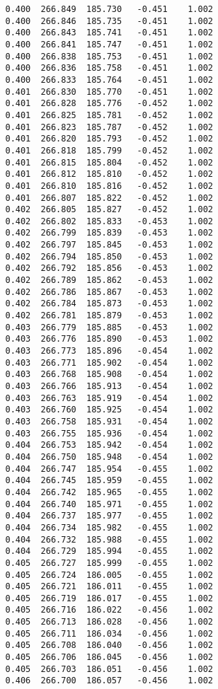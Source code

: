 \begin{verbatim}
   0.400  266.849  185.730   -0.451    1.002
   0.400  266.846  185.735   -0.451    1.002
   0.400  266.843  185.741   -0.451    1.002
   0.400  266.841  185.747   -0.451    1.002
   0.400  266.838  185.753   -0.451    1.002
   0.400  266.836  185.758   -0.451    1.002
   0.400  266.833  185.764   -0.451    1.002
   0.401  266.830  185.770   -0.451    1.002
   0.401  266.828  185.776   -0.452    1.002
   0.401  266.825  185.781   -0.452    1.002
   0.401  266.823  185.787   -0.452    1.002
   0.401  266.820  185.793   -0.452    1.002
   0.401  266.818  185.799   -0.452    1.002
   0.401  266.815  185.804   -0.452    1.002
   0.401  266.812  185.810   -0.452    1.002
   0.401  266.810  185.816   -0.452    1.002
   0.401  266.807  185.822   -0.452    1.002
   0.402  266.805  185.827   -0.452    1.002
   0.402  266.802  185.833   -0.453    1.002
   0.402  266.799  185.839   -0.453    1.002
   0.402  266.797  185.845   -0.453    1.002
   0.402  266.794  185.850   -0.453    1.002
   0.402  266.792  185.856   -0.453    1.002
   0.402  266.789  185.862   -0.453    1.002
   0.402  266.786  185.867   -0.453    1.002
   0.402  266.784  185.873   -0.453    1.002
   0.402  266.781  185.879   -0.453    1.002
   0.403  266.779  185.885   -0.453    1.002
   0.403  266.776  185.890   -0.453    1.002
   0.403  266.773  185.896   -0.454    1.002
   0.403  266.771  185.902   -0.454    1.002
   0.403  266.768  185.908   -0.454    1.002
   0.403  266.766  185.913   -0.454    1.002
   0.403  266.763  185.919   -0.454    1.002
   0.403  266.760  185.925   -0.454    1.002
   0.403  266.758  185.931   -0.454    1.002
   0.403  266.755  185.936   -0.454    1.002
   0.404  266.753  185.942   -0.454    1.002
   0.404  266.750  185.948   -0.454    1.002
   0.404  266.747  185.954   -0.455    1.002
   0.404  266.745  185.959   -0.455    1.002
   0.404  266.742  185.965   -0.455    1.002
   0.404  266.740  185.971   -0.455    1.002
   0.404  266.737  185.977   -0.455    1.002
   0.404  266.734  185.982   -0.455    1.002
   0.404  266.732  185.988   -0.455    1.002
   0.404  266.729  185.994   -0.455    1.002
   0.405  266.727  185.999   -0.455    1.002
   0.405  266.724  186.005   -0.455    1.002
   0.405  266.721  186.011   -0.455    1.002
   0.405  266.719  186.017   -0.455    1.002
   0.405  266.716  186.022   -0.456    1.002
   0.405  266.713  186.028   -0.456    1.002
   0.405  266.711  186.034   -0.456    1.002
   0.405  266.708  186.040   -0.456    1.002
   0.405  266.706  186.045   -0.456    1.002
   0.405  266.703  186.051   -0.456    1.002
   0.406  266.700  186.057   -0.456    1.002

\end{verbatim}
